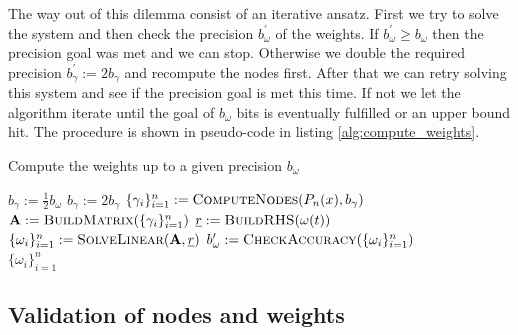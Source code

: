 \documentclass[a4paper,10pt]{article}
\begin{document}
The way out of this dilemma consist of an iterative ansatz. First we try to
solve the system and then check the precision $b_{\omega}^{\prime}$ of the
weights. If $b_{\omega}^{\prime} \geq b_{\omega}$ then the precision goal was
met and we can stop. Otherwise we double the required precision
$b_{\gamma}^{\prime} := 2 b_{\gamma}$ and recompute the nodes first. After
that we can retry solving this system and see if the precision goal is met
this time. If not we let the algorithm iterate until the goal of $b_{\omega}$ bits
is eventually fulfilled or an upper bound hit. The procedure is shown in pseudo-code
in listing \ref{alg:compute_weights}.

\begin{algorithm}
  \caption{Compute the weights up to a given precision $b_{\omega}$}
  \label{alg:compute_weights}
  \begin{algorithmic}
      \State $b_{\gamma} := \frac{1}{2} b_{\omega}$
      \Repeat
        \State $b_{\gamma} := 2 b_{\gamma}$
        \State $\{\gamma_i\}_{i=1}^{n} := \textsc{ComputeNodes}(P_n(x), b_{\gamma})$
        \State $\mat{A} := \textsc{BuildMatrix}(\{\gamma_i\}_{i=1}^{n})$
        \State $\vec{r} := \textsc{BuildRHS}(\omega(t))$
        \State $\{\omega_i\}_{i=1}^{n} := \textsc{SolveLinear}(\mat{A}, \vec{r})$
        \State $b^{\prime}_{\omega} := \textsc{CheckAccuracy}(\{\omega_i\}_{i=1}^{n})$
       \\
      \Return $\{\omega_i\}_{i=1}^{n}$
    \EndProcedure
  \end{algorithmic}
\end{algorithm}


\FloatBarrier
\subsection{Validation of nodes and weights}
\label{sec:validation_nodes_weights}
\end{document}
